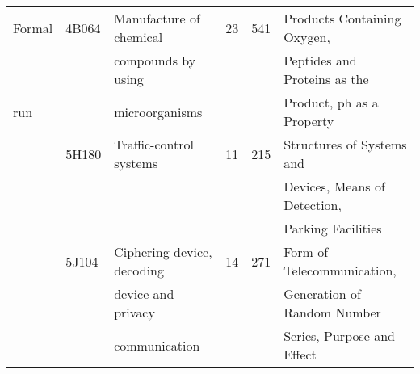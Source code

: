 \documentclass[english]{jnlp_1.2c}
\begin{document}
\begin{table}[t]
\begin{footnotesize}
\begin{center}
\begin{tabular}{|l|l|l|l|l|l|}
\multicolumn{1}{|l|}{Formal}    & 4B064 & Manufacture of chemical                & 23 & 541 & Products Containing Oxygen,               \\
\multicolumn{1}{|l|}{}                  &               & compounds by using                     &    &         & Peptides and Proteins as the          \\
\multicolumn{1}{|l|}{run}               &               & microorganisms                                 &    &         & Product, ph as a Property           \\\cline{2-6}
\multicolumn{1}{|l|}{}                  & 5H180 & Traffic-control systems                & 11 & 215 & Structures of Systems and                 \\
\multicolumn{1}{|l|}{}                  &               &                                                                &    &         & Devices, Means of Detection,          \\
\multicolumn{1}{|l|}{}                  &               &                                                                &    &         & Parking Facilities                          \\\cline{2-6}
\multicolumn{1}{|l|}{}                  & 5J104 & Ciphering device, decoding     & 14 & 271 & Form of Telecommunication,                \\
\multicolumn{1}{|l|}{}                  &               & device and privacy                     &    &         & Generation of Random Number           \\
\multicolumn{1}{|l|}{}                  &               & communication                                  &    &         & Series, Purpose and Effect          \\\hline
\end{tabular}
\end{center}
\end{footnotesize}
\end{table}
\end{document}

